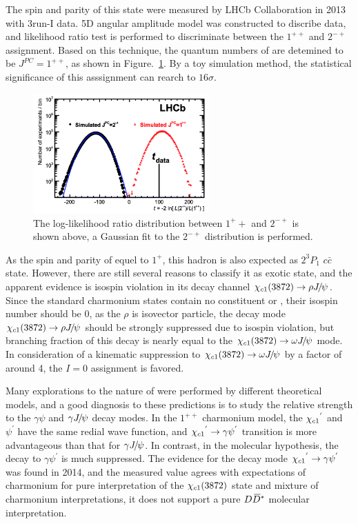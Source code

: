The spin and parity of this state were measured by LHCb Collaboration in 2013 with 3\invfb run-I data\supercite{LHCb-PAPER-2013-001}.
5D angular amplitude model was constructed to discribe data,
and likelihood ratio test is performed to discriminate between the $1^{++}$ and $2^{-+}$ assignment.
Based on this technique,
the quantum numbers of \theX are detemined to be $J^{PC}=1^{++}$,
as shown in Figure.~\ref{fig:X3872_spin}.
By a toy simulation method,
the statistical significance of this asssignment can rearch to $16\sigma$.

\begin{figure}[!hbtp]
\centering
\includegraphics[width=0.6\textwidth]{Figures/01_Introduction/Exotic/X3872_Spin}%
   \caption{ The log-likelihood ratio distribution between $1^++$ and $2^{-+}$ is shown above,
   a Gaussian fit to the $2^{-+}$ distribution is performed\supercite{LHCb-PAPER-2013-001}.}
\label{fig:X3872_spin}
\end{figure}

As the spin and parity of \theX equel to $1^{+}$,
this hadron is also expected as $2^{3}P_{1}$ $c\bar{c}$ state.
However, 
there are still several reasons to classify it as exotic state\supercite{Olsen:2017bmm},
and the apparent evidence is isospin violation in its decay channel ${\chi_{c1}(3872)}\rightarrow\rho{\ensuremath{{J\mskip -3mu/\mskip -2mu\psi}}}$.
Since the standard charmonium states contain no constituent \uquark or \dquark,
their isospin number should be 0,
as the $\rho$ is isovector particle, 
the decay mode ${\chi_{c1}(3872)}\rightarrow\rho{\ensuremath{{J\mskip -3mu/\mskip -2mu\psi}}}$ should be strongly suppressed due to isospin violation, 
but branching fraction of this decay is nearly equal to the ${\chi_{c1}(3872)}\rightarrow\omega{\ensuremath{{J\mskip -3mu/\mskip -2mu\psi}}}$ mode.
In consideration of a kinematic suppression to ${\chi_{c1}(3872)}\rightarrow\omega{\ensuremath{{J\mskip -3mu/\mskip -2mu\psi}}}$ by a factor of around 4,
the $I=0$ assignment is favored.

Many explorations to the nature of \theX were performed by different theoretical models\supercite{LIU2019237},
and a good diagnosis to these predictions is to study the relative strength to the $\gamma\psi$ and $\gamma{\ensuremath{{J\mskip -3mu/\mskip -2mu\psi}}}$ decay modes.
In the $1^{++}$ charmonium model, 
the ${\chi_{{c} 1}}^{'}$ and $\psi^{'}$ have the same redial wave function,
and ${\chi_{{c} 1}}^{'}\rightarrow\gamma\psi^{'}$ transition is more advantageous than that for $\gamma{\ensuremath{{J\mskip -3mu/\mskip -2mu\psi}}}$.
In contrast,
in the molecular hypothesis,
the decay to $\gamma\psi^{'}$ is much suppressed\supercite{SWANSON2004189,SWANSON2004197,Dong_2010}.
The evidence for the decay mode ${\chi_{{c} 1}}^{'}\rightarrow\gamma\psi^{'}$ was found in 2014, 
and the measured value agrees with expectations of charmonium for pure interpretation of the ${\chi_{c1}(3872)}$ state
and mixture of charmonium interpretations,
it does not support a pure ${D}{{\kern 0.18em\overline{\kern -0.18em D}}{}^*}$ molecular interpretation\supercite{LHCb-PAPER-2014-008}.

